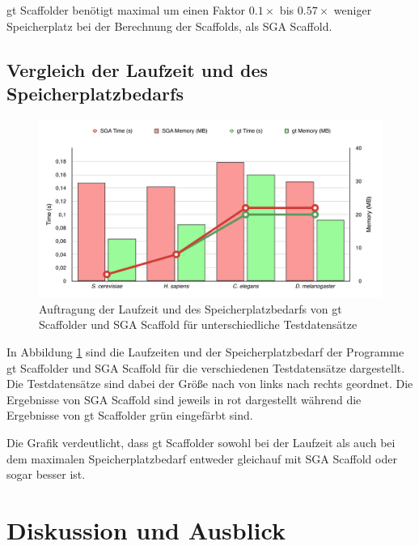 \documentclass[a4paper,10pt,parskip]{scrartcl}
\begin{document}
gt Scaffolder benötigt maximal um einen Faktor $0.1\times$ bis
$0.57\times$ weniger Speicherplatz bei der Berechnung der Scaffolds,
als SGA Scaffold.

\subsection{Vergleich der Laufzeit und des Speicherplatzbedarfs}
\begin{figure}[t]
  \includegraphics[width=\textwidth,height=0.8\textheight,keepaspectratio]{presentation/figures/sga_vs_gt.pdf}
  \caption{\label{abb: Zeit}Auftragung der Laufzeit und des
    Speicherplatzbedarfs von gt Scaffolder und SGA Scaffold für
    unterschiedliche Testdatensätze}
\end{figure}

In Abbildung \ref{abb: Zeit} sind die Laufzeiten und der
Speicherplatzbedarf der Programme gt Scaffolder und SGA Scaffold für
die verschiedenen Testdatensätze dargestellt. Die Testdatensätze sind
dabei der Größe nach von links nach rechts geordnet. Die Ergebnisse
von SGA Scaffold sind jeweils in rot dargestellt während die
Ergebnisse von gt Scaffolder grün eingefärbt sind.

Die Grafik verdeutlicht, dass gt Scaffolder sowohl bei der Laufzeit
als auch bei dem maximalen Speicherplatzbedarf entweder gleichauf mit
SGA Scaffold oder sogar besser ist.



\section{Diskussion und Ausblick}\label{sec: Ausblick}
\end{document}
